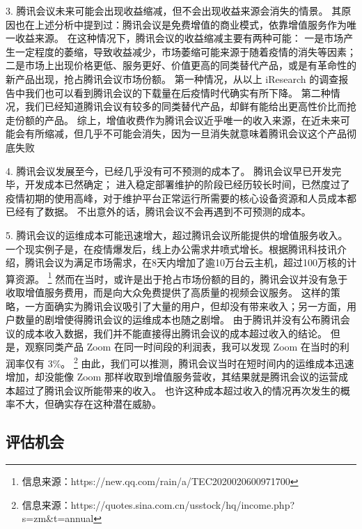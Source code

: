 \documentclass[a4paper,12pt]{article}
\begin{document}
    3.
    腾讯会议未来可能会出现收益缩减，但不会出现收益来源会消失的情景。
    其原因也在上述分析中提到过：腾讯会议是免费增值的商业模式，依靠增值服务作为唯一收益来源。
    在这种情况下，腾讯会议的收益缩减主要有两种可能：
    一是市场产生一定程度的萎缩，导致收益减少，市场萎缩可能来源于随着疫情的消失等因素；
    二是市场上出现价格更低、服务更好、价值更高的同类替代产品，或是有革命性的新产品出现，抢占腾讯会议市场份额。
    第一种情况，从以上 iResearch 的调查报告中我们也可以看到腾讯会议的下载量在后疫情时代确实有所下降。
    第二种情况，我们已经知道腾讯会议有较多的同类替代产品，却鲜有能给出更高性价比而抢走份额的产品。
    综上，增值收费作为腾讯会议近乎唯一的收入来源，在近未来可能会有所缩减，但几乎不可能会消失，因为一旦消失就意味着腾讯会议这个产品彻底失败


    4.
    腾讯会议发展至今，已经几乎没有可不预测的成本了。
    腾讯会议早已开发完毕，开发成本已然确定；
    进入稳定部署维护的阶段已经历较长时间，已然度过了疫情初期的使用高峰，对于维护平台正常运行所需要的核心设备资源和人员成本都已经有了数据。
    不出意外的话，腾讯会议不会再遇到不可预测的成本。

    5.
    腾讯会议的运维成本可能迅速增大，超过腾讯会议所能提供的增值服务收入。
    一个现实例子是，在疫情爆发后，线上办公需求井喷式增长。根据腾讯科技讯介绍，腾讯会议为满足市场需求，在8天内增加了逾10万台云主机，超过100万核的计算资源。
    \footnote{信息来源：https://new.qq.com/rain/a/TEC2020020600971700}
    然而在当时，或许是出于抢占市场份额的目的，腾讯会议并没有急于收取增值服务费用，而是向大众免费提供了高质量的视频会议服务。
    这样的策略，一方面确实为腾讯会议吸引了大量的用户，但却没有带来收入；另一方面，用户数量的剧增使得腾讯会议的运维成本也随之剧增。
    由于腾讯并没有公布腾讯会议的成本收入数据，我们并不能直接得出腾讯会议的成本超过收入的结论。
    但是，观察同类产品 Zoom 在同一时间段的利润表，我可以发现 Zoom 在当时的利润率仅有 3\%。
    \footnote{信息来源：https://quotes.sina.com.cn/usstock/hq/income.php?s=zm\&t=annual}
    由此，我们可以推测，腾讯会议当时在短时间内的运维成本迅速增加，却没能像 Zoom 那样收取到增值服务营收，其结果就是腾讯会议的运营成本超过了腾讯会议所能带来的收入。
    也许这种成本超过收入的情况再次发生的概率不大，但确实存在这种潜在威胁。

    \subsection{评估机会}\label{subsec:opportunity}
\end{document}
